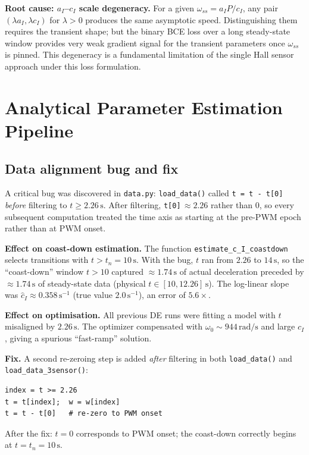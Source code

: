 \documentclass[11pt,a4paper]{article}
\begin{document}
\textbf{Root cause: $a_I$--$c_I$ scale degeneracy.}  For a given
$\omega_{ss}=a_IP/c_I$, any pair $(\lambda a_I, \lambda c_I)$ for
$\lambda>0$ produces the same asymptotic speed.  Distinguishing them
requires the transient shape; but the binary BCE loss over a long steady-state
window provides very weak gradient signal for the transient parameters once
$\omega_{ss}$ is pinned.  This degeneracy is a fundamental limitation of
the single Hall sensor approach under this loss formulation.

\section{Analytical Parameter Estimation Pipeline}

\subsection{Data alignment bug and fix}

A critical bug was discovered in \texttt{data.py}: \texttt{load\_data()} called
\texttt{t = t - t[0]} \emph{before} filtering to $t\geq 2.26\,\text{s}$.
After filtering, \texttt{t[0]}\,$\approx 2.26$ rather than $0$, so every
subsequent computation treated the time axis as starting at the pre-PWM
epoch rather than at PWM onset.

\textbf{Effect on coast-down estimation.}  The function
\texttt{estimate\_c\_I\_coastdown} selects transitions with $t > t_n = 10\,\text{s}$.
With the bug, $t$ ran from $2.26$ to $14\,\text{s}$, so the ``coast-down''
window $t > 10$ captured $\approx 1.74\,\text{s}$ of actual deceleration
preceded by $\approx 1.74\,\text{s}$ of steady-state data
(physical $t \in [10, 12.26]\,\text{s}$).
The log-linear slope was $\hat{c}_I \approx 0.358\,\text{s}^{-1}$ (true value
$2.0\,\text{s}^{-1}$), an error of $5.6\times$.

\textbf{Effect on optimisation.}  All previous DE runs were fitting a
model with $t$ misaligned by $2.26\,\text{s}$.  The optimizer compensated with
$\omega_0 \sim 944\,\text{rad/s}$ and large $c_I$, giving a spurious
``fast-ramp'' solution.

\textbf{Fix.}  A second re-zeroing step is added \emph{after} filtering in
both \texttt{load\_data()} and \texttt{load\_data\_3sensor()}:
\begin{verbatim}
index = t >= 2.26
t = t[index];  w = w[index]
t = t - t[0]   # re-zero to PWM onset
\end{verbatim}
After the fix: $t=0$ corresponds to PWM onset; the coast-down correctly
begins at $t = t_n = 10\,\text{s}$.
\end{document}
